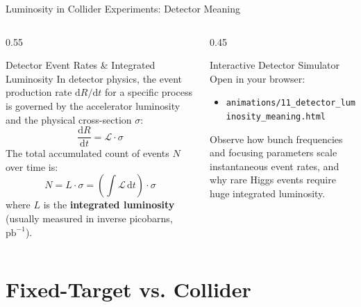 \documentclass[aspectratio=169]{beamer}
\begin{document}
\begin{frame}{Luminosity in Collider Experiments: Detector Meaning}
    \begin{columns}
        \begin{column}{0.55\textwidth}
            \begin{block}{Detector Event Rates \& Integrated Luminosity}
                In detector physics, the event production rate $\mathrm{d}R/\mathrm{d}t$ for a specific process is governed by the accelerator luminosity and the physical cross-section $\sigma$:
                \[ \frac{\mathrm{d}R}{\mathrm{d}t} = \mathcal{L} \cdot \sigma \]
                The total accumulated count of events $N$ over time is:
                \[ N = L \cdot \sigma = \left( \int \mathcal{L} \, \mathrm{d}t \right) \cdot \sigma \]
                where $L$ is the \textbf{integrated luminosity} (usually measured in inverse picobarns, $\mathrm{pb}^{-1}$).
            \end{block}
        \end{column}
        \begin{column}{0.45\textwidth}
            \begin{alertblock}{Interactive Detector Simulator}
                Open in your browser:
                \begin{itemize}
                    \item \texttt{animations/11\_detector\_luminosity\_meaning.html}
                \end{itemize}
                Observe how bunch frequencies and focusing parameters scale instantaneous event rates, and why rare Higgs events require huge integrated luminosity.
            \end{alertblock}
        \end{column}
    \end{columns}
\end{frame}

\section{Fixed-Target vs. Collider}
\end{document}
